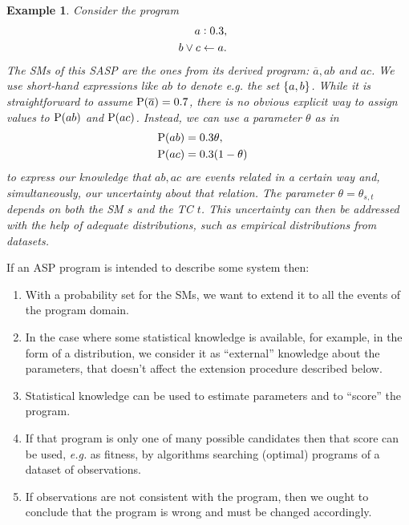\documentclass{article}
\newtheorem{example}{Example}
\newcommand{\at}[1]{\ensuremath{\!\del{#1}}}
\newcommand{\co}[1]{\ensuremath{\overline{#1}}}
\newcommand{\prfunc}{\ensuremath{\mathrm{P}}}
\newcommand{\pr}[1]{\ensuremath{\prfunc\at{#1}}}
\newcommand{\probfact}[2]{\ensuremath{#1:#2}}%
\newcommand{\bruno}{\color{red!60!black}}
\begin{document}
\begin{example}\label{running.example}
	Consider the program
	\begin{equation}
		\begin{aligned}
			\probfact{a&}{0.3} ,\cr
			b \vee c          & \leftarrow a.
		\end{aligned}
		\label{eq:example.1}
	\end{equation}
	The \aclp{SM} of this \ac{SASP} are the ones from its derived
	program: $\co{a}, ab$ and $ac$.  We use short-hand expressions
	like $ab$ to denote \textit{e.g.} the set $\set{a, b}$.  While it
	is straightforward to assume $\pr{\co{a}}=0.7$, there is no
	obvious explicit way to assign values to $\pr{ab}$ and $\pr{ac}$.
	Instead, we can use a parameter $\theta$ as in
	$$
	\begin{aligned}
	  \pr{ab} & = 0.3 \theta,\cr
				\pr{ac} & = 0.3 (1 - \theta)
	\end{aligned}
	$$
	to express our knowledge that $ab,ac$ are events related in a
	certain way and, simultaneously, our uncertainty about that
	relation.  The pa\-ra\-me\-ter $\theta=\theta_{s,t}$ depends on
	both the \acl{SM} $s$ and the \acl{TC} $t$.  This uncertainty can
	then be addressed with the help of adequate distributions, such as
	empirical distributions from datasets.
\end{example}

If an \ac{ASP} program is intended to describe some system then:

\begin{enumerate}

\item With a probability set for the \aclp{SM}, we want to extend it
  to all the events of the program domain.

\item In the case where some statistical knowledge is available, for
  example, in the form of a distribution, we consider it as
  ``external'' knowledge about the parameters, that doesn't affect the
  extension procedure described below.

\item Statistical knowledge can be used to estimate parameters and to
  ``score'' the program.

\item\label{item:program.selection} If that program is only one of
  many possible candidates then that score can be used, \emph{e.g.} as
  fitness, by algorithms searching (optimal) programs of a dataset of
  observations.

\item If observations are not consistent with the program, then we
  ought to conclude that the program is wrong and must be changed
  accordingly.
\end{enumerate}
\end{document}
